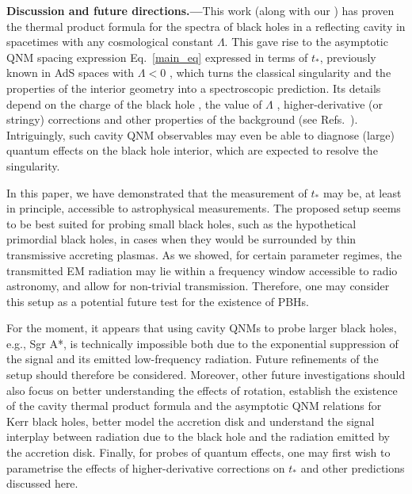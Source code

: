 \documentclass[prd,aps,twocolumn,amsfonts,showpacs,superscriptaddress,preprintnumbers,nofootinbib]{revtex4-2}
\begin{document}

{\bf Discussion and future directions.---}This work (along with our \cite{Grozdanov:2026ktq}) has proven the thermal product formula for the spectra of black holes in a reflecting cavity in spacetimes with any cosmological constant $\Lambda$. This gave rise to the asymptotic QNM spacing expression Eq.~\eqref{main_eq} expressed in terms of $t_*$, previously known in AdS spaces with $\Lambda < 0$ \cite{Fidkowski:2003nf,Festuccia:2005pi,dodelson2023thermal}, which turns the classical singularity and the properties of the interior geometry into a spectroscopic prediction. Its details depend on the charge of the black hole \cite{Ceplak:2025dds,AliAhmad:2026wem,futureNEJC}, the value of $\Lambda$ \cite{Arnaudo:2026tcy,Grozdanov:2026ktq}, higher-derivative (or stringy) corrections \cite{Dodelson:2025jff,futureHONG} and other properties of the background (see Refs.~\cite{Buric:2025anb,Buric:2025fye,Valach:2025saf,Afkhami-Jeddi:2025wra,Jia:2025jbi,Jia:2026pmv,Araya:2026shz,Giombi:2026kdz,Grozdanov:2026cut,Jia:2026ryl,Buric:2026qsp,Buric:2026cmn,Arnaudo:2026axe}). Intriguingly, such cavity QNM observables may even be able to diagnose (large) quantum effects on the black hole interior, which are expected to resolve the singularity.

In this paper, we have demonstrated that the measurement of $t_*$ may be, at least in principle, accessible to astrophysical measurements. The proposed setup seems to be best suited for probing small black holes, such as the hypothetical primordial black holes, in cases when they would be surrounded by thin transmissive accreting plasmas. As we showed, for certain parameter regimes, the transmitted EM radiation may lie within a frequency window accessible to radio astronomy, and allow for non-trivial transmission. Therefore, one may consider this setup as a potential future test for the existence of PBHs.  

For the moment, it appears that using cavity QNMs to probe larger black holes, e.g., Sgr A*, is technically impossible both due to the exponential suppression of the signal and its emitted low-frequency radiation. Future refinements of the setup should therefore be considered. Moreover, other future investigations should also focus on better understanding the effects of rotation, establish the existence of the cavity thermal product formula and the asymptotic QNM relations for Kerr black holes, better model the accretion disk and understand the signal interplay between radiation due to the black hole and the radiation emitted by the accretion disk. Finally, for probes of quantum effects, one may first wish to parametrise the effects of higher-derivative corrections on $t_*$ and other predictions discussed here. 
\end{document}
